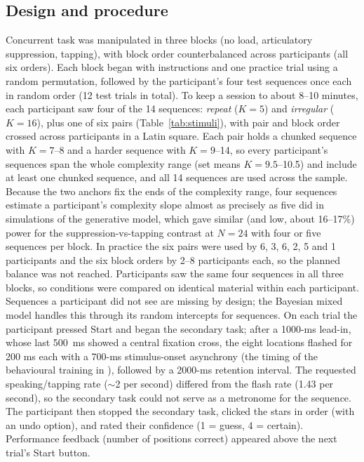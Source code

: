 \documentclass[11pt,a4paper]{article}
\begin{document}
\subsection{Design and procedure}
Concurrent task was manipulated in three blocks (no load, articulatory suppression, tapping), with block order counterbalanced
across participants (all six orders). Each block began with instructions and one practice trial using a random permutation, followed by the
participant's four test sequences once each in random order (12 test trials in total). To keep a session to about 8--10
minutes, each participant saw four of the 14 sequences: \emph{repeat} ($K = 5$) and \emph{irregular} ($K = 16$), plus one
of six pairs (Table~\ref{tab:stimuli}), with pair and block order crossed across participants in a Latin square. Each pair
holds a chunked sequence with $K = 7$--8 and a harder sequence with $K = 9$--14, so every participant's sequences span the
whole complexity range (set means $K = 9.5$--10.5) and include at least one chunked sequence, and all 14 sequences are used
across the sample. Because the two anchors fix the ends of the complexity range, four sequences estimate a participant's
complexity slope almost as precisely as five did in simulations of the generative model, which gave similar (and low,
about 16--17\%) power for the suppression-vs-tapping contrast at $N = 24$ with four or five sequences per block. In practice the
six pairs were used by 6, 3, 6, 2, 5 and 1 participants and the six block orders by 2--8 participants each, so the planned balance was
not reached. Participants saw the same four sequences in all three blocks, so conditions were compared on identical material
within each participant. Sequences a
participant did not see are missing by design; the Bayesian mixed model handles this through its random intercepts for
sequences. On each
trial the participant pressed Start and began the secondary task; after a 1000-ms lead-in, whose last 500~ms showed a
central fixation cross, the eight locations flashed for 200 ms
each with a 700-ms stimulus-onset asynchrony (the timing of the behavioural training in \citealp{alroumi2021mental}), followed by
a 2000-ms retention interval. The requested speaking/tapping rate ($\sim$2 per second) differed from the flash rate (1.43 per
second), so the secondary task could not serve as a metronome for the sequence. The
participant then stopped the secondary task, clicked the stars in order (with an undo option), and rated their confidence
(1 = guess, 4 = certain). Performance feedback (number of positions correct) appeared above the next trial's Start button.
\end{document}
